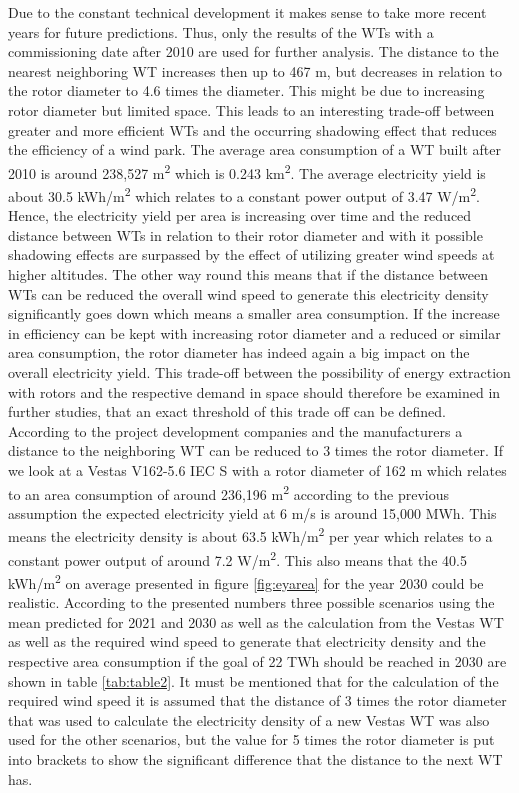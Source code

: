 \documentclass[a4paper,11pt]{article}
\begin{document}
Due to the constant technical development it makes sense to take more recent years for future predictions. Thus, only the results of the WTs with a commissioning date after 2010 are used for further analysis. The distance to the nearest neighboring WT increases then up to 467 m, but decreases in relation to the rotor diameter to 4.6 times the diameter. This might be due to increasing rotor diameter but limited space. This leads to an interesting trade-off between greater and more efficient WTs and the occurring shadowing effect that reduces the efficiency of a wind park. The average area consumption of a WT built after 2010 is around 238,527 m\textsuperscript{2} which is 0.243 km\textsuperscript{2}. The average electricity yield is about 30.5 kWh/m\textsuperscript{2} which relates to a constant power output of 3.47 W/m\textsuperscript{2}. Hence, the electricity yield per area is increasing over time and the reduced distance between WTs in relation to their rotor diameter and with it possible shadowing effects are surpassed by the effect of utilizing greater wind speeds at higher altitudes. The other way round this means that if the distance between WTs can be reduced the overall wind speed to generate this electricity density significantly goes down which means a smaller area consumption. If the increase in efficiency can be kept with increasing rotor diameter and a reduced or similar area consumption, the rotor diameter has indeed again a big impact on the overall electricity yield. This trade-off between the possibility of energy extraction with rotors and the respective demand in space should therefore be examined in further studies, that an exact threshold of this trade off can be defined. According to the project development companies and the manufacturers a distance to the neighboring WT can be reduced to 3 times the rotor diameter. If we look at a Vestas V162-5.6 IEC S with a rotor diameter of 162 m which relates to an area consumption of around 236,196 m\textsuperscript{2} according to the previous assumption the expected electricity yield at 6 m/s is around 15,000 MWh. This means the electricity density is about 63.5 kWh/m\textsuperscript{2} per year which relates to a constant power output of around 7.2 W/m\textsuperscript{2}. This also means that the 40.5 kWh/m\textsuperscript{2} on average presented in figure \ref{fig:eyarea} for the year 2030 could be realistic. According to the presented numbers three possible scenarios using the mean predicted for 2021 and 2030 as well as the calculation from the Vestas WT as well as the required wind speed to generate that electricity density and the respective area consumption if the goal of 22 TWh should be reached in 2030 are shown in table \ref{tab:table2}. It must be mentioned that for the calculation of the required wind speed it is assumed that the distance of 3 times the rotor diameter that was used to calculate the electricity density of a new Vestas WT was also used for the other scenarios, but the value for 5 times the rotor diameter is put into brackets to show the significant difference that the distance to the next WT has.
\end{document}
